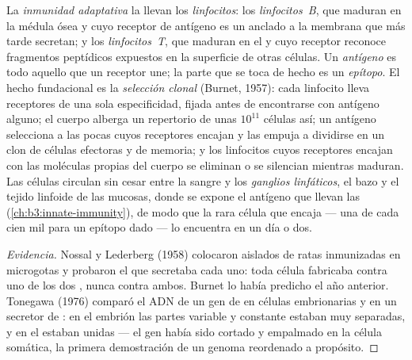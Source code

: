 \begin{definition}\label{def:b3:adaptive-immunity:lymphocytes}
La \emph{inmunidad adaptativa} la llevan los \emph{linfocitos}: los
\emph{linfocitos~B}, que maduran en la médula ósea y cuyo receptor de
antígeno es un \emph{} anclado a la membrana que más tarde
secretan; y los \emph{linfocitos~T}, que maduran en el  y cuyo
receptor reconoce fragmentos peptídicos expuestos en la superficie de
otras células. Un \emph{antígeno} es todo aquello que un receptor une; la
parte que se toca de hecho es un \emph{epítopo}. El hecho fundacional es
la \emph{selección clonal} (Burnet, 1957): cada linfocito lleva
receptores de una sola especificidad, fijada antes de encontrarse con
antígeno alguno; el cuerpo alberga un repertorio de unas $10^{11}$
células así; un antígeno selecciona a las pocas cuyos receptores encajan
y las empuja a dividirse en un clon de células efectoras y de memoria; y
los linfocitos cuyos receptores encajan con las moléculas propias del
cuerpo se eliminan o se silencian mientras maduran. Las células circulan
sin cesar entre la sangre y los \emph{ganglios linfáticos}, el bazo y el
tejido linfoide de las mucosas, donde se expone el antígeno que llevan
las  (\cref{ch:b3:innate-immunity}), de modo que la
rara célula que encaja --- una de cada cien mil para un epítopo dado ---
lo encuentra en un día o dos.
\end{definition}

\begin{proof}[Evidencia]
Nossal y Lederberg (1958) colocaron  aislados de ratas
inmunizadas en microgotas y probaron el  que secretaba cada
uno: toda célula fabricaba  contra uno de los dos ,
nunca contra ambos. Burnet lo había predicho el año anterior. Tonegawa
(1976) comparó el ADN de un gen de  en células embrionarias y
en un  secretor de : en el embrión las partes variable y
constante estaban muy separadas, y en el  estaban unidas --- el gen
había sido cortado y empalmado en la célula somática, la primera
demostración de un genoma reordenado a propósito.
\end{proof}

